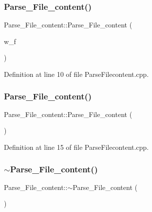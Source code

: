 \subsubsection{\texorpdfstring{Parse\+\_\+\+File\+\_\+content()}{Parse\_File\_content()}\hspace{0.1cm}{\footnotesize\ttfamily [1/2]}}
{\footnotesize\ttfamily Parse\+\_\+\+File\+\_\+content\+::\+Parse\+\_\+\+File\+\_\+content (\begin{DoxyParamCaption}\item[{\mbox{\hyperlink{class_file_handler}{File\+Handler}}}]{w\+\_\+f }\end{DoxyParamCaption})}



Definition at line 10 of file Parse\+Filecontent.\+cpp.

\mbox{\label{class_parse___file__content_a559ef5526225c22747225d5805ebcd86}} 
\subsubsection{\texorpdfstring{Parse\+\_\+\+File\+\_\+content()}{Parse\_File\_content()}\hspace{0.1cm}{\footnotesize\ttfamily [2/2]}}
{\footnotesize\ttfamily Parse\+\_\+\+File\+\_\+content\+::\+Parse\+\_\+\+File\+\_\+content (\begin{DoxyParamCaption}{ }\end{DoxyParamCaption})}



Definition at line 15 of file Parse\+Filecontent.\+cpp.

\mbox{\label{class_parse___file__content_af3c8fc07e2f9a0fdafb596adbc1e167a}} 
\subsubsection{\texorpdfstring{$\sim$\+Parse\+\_\+\+File\+\_\+content()}{~Parse\_File\_content()}}
{\footnotesize\ttfamily Parse\+\_\+\+File\+\_\+content\+::$\sim$\+Parse\+\_\+\+File\+\_\+content (\begin{DoxyParamCaption}{ }\end{DoxyParamCaption})\hspace{0.3cm}{\ttfamily [virtual]}}




